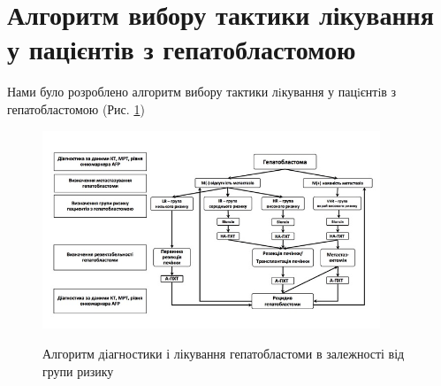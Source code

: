 \section{Алгоритм вибору тактики лікування у пацієнтів з гепатобластомою}
Нами було розроблено алгоритм вибору тактики лiкування у пацiєнтiв з гепатобластомою (Рис. \ref{fig:algoritm})
\begin{figure}[h]
\caption{Алгоритм діагностики і лікування гепатобластоми в залежності від групи ризику}
\centering
\includegraphics[width=0.9\textwidth]{Illustrations/algoritm.jpg}
\label{fig:algoritm} 
\end{figure}